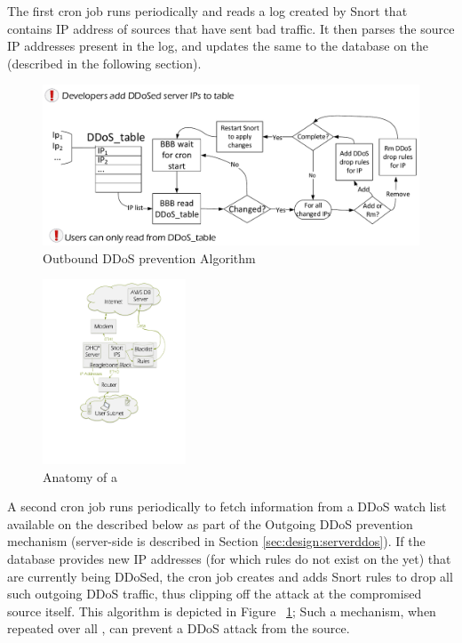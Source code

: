 The first cron job runs periodically and reads a log created by Snort that contains IP address of sources that have sent bad traffic. It then parses the source IP addresses present in the log, and updates the same to the database on the \servname (described in the following section). \\

\begin{figure}
    \centering
    \includegraphics[width=0.95\linewidth]{figs/ddosserv.pdf}
    \caption{Outbound DDoS prevention Algorithm}
    \label{fig:ddostable}
\end{figure}

\begin{figure}
    \centering
    \includegraphics[height=5.5cm]{figs/microarch.pdf}
    \caption{Anatomy of a \servname}
    \label{fig:guardian}
\end{figure}

A second cron job runs periodically to fetch information from a DDoS watch list available on the \servname described below as part of the Outgoing DDoS prevention mechanism (server-side is described in Section \ref{sec:design:serverddos}). If the database provides new IP addresses (for which rules do not exist on the \nodename yet) that are currently being DDoSed, the cron job creates and adds Snort rules to drop all such outgoing DDoS traffic, thus clipping off the attack at the compromised source itself. 
This algorithm is depicted in Figure ~\ref{fig:ddostable}; Such a mechanism, when repeated over all \servnames, can prevent a DDoS attack from the source. \\


